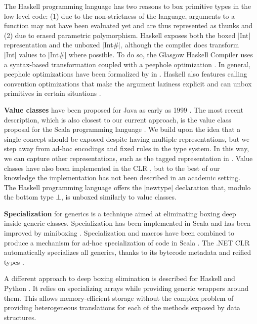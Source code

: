 The Haskell programming language has two reasons to box primitive types in the low level code: (1) due to the non-strictness of the language, arguments to a function may not have been evaluated yet and are thus represented as thunks and (2) due to erased parametric polymorphism. Haskell exposes both the boxed |Int| representation and the unboxed |Int#|, although the compiler does transform |Int| values to |Int#| where possible. To do so, the Glasgow Haskell Compiler uses a syntax-based transformation coupled with a peephole optimization \cite{spj-unboxed-values, launchbury-unpointed}. In general, peephole optimizations have been formalized by  in \cite{henglein-formally-optimal-boxing}. Haskell also features calling convention optimizations that make the argument laziness explicit and can unbox primitives in certain situations \cite{bolingbroke-haskell-calling-conventions}.

\textbf{Value classes} have been proposed for Java as early as 1999 \cite{gosling-value-classes, rose-value-classes-vm, rose-value-classes-tearing}. The most recent description, which is also closest to our current approach, is the value class proposal for the Scala programming language \cite{scala-value-classes-sip}. We build upon the idea that a single concept should be exposed despite having multiple representations, but we step away from ad-hoc encodings and fixed rules in the type system. In this way, we can capture other representations, such as the tagged representation in \cite{morrison-napier88}. Value classes have also been implemented in the CLR \cite{dot-net-value-types-www}, but to the best of our knowledge the implementation has not been described in an academic setting. The Haskell programming language offers the |newtype| declaration \cite{haskell-newtype} that, modulo the bottom type $\bot$, is unboxed similarly to value classes.

\textbf{Specialization} for generics is a technique aimed at eliminating boxing deep inside generic classes. Specialization has been implemented in Scala \cite{iuli-thesis, specialization-iuli} and has been improved by miniboxing \cite{miniboxing, miniboxing-www}. Specialization and macros have been combined to produce a mechanism for ad-hoc specialization of code in Scala \cite{bridging}. The .NET CLR automatically specializes all generics, thanks to its bytecode metadata and reified types \cite{dot-net-generics}.

A different approach to deep boxing elimination is described for Haskell \cite{spj-dph} and Python \cite{bolz-python-strategies}. It relies on specializing arrays while providing generic wrappers around them. This allows memory-efficient storage without the complex problem of providing heterogeneous translations for each of the methods exposed by data structures.

